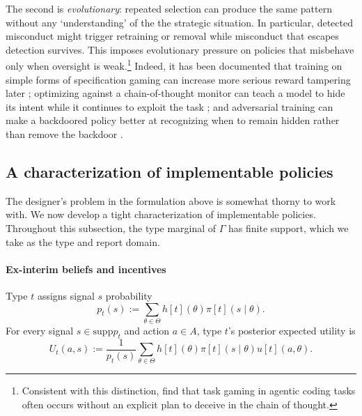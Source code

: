\documentclass[12pt,reqno]{article}
\newcommand{\supp}{\mathrm{supp}}
\newcommand{\Rbar}{\overline{\mathbb{R}}}
\theoremstyle{definition} \newtheorem{example}{Example}
\theoremstyle{definition} \newtheorem{condition}{Condition}
\theoremstyle{definition} \newtheorem{corollary}{Corollary}
\theoremstyle{definition} \newtheorem{claim}{Claim}
\theoremstyle{definition} \newtheorem{definition}{Definition}
\theoremstyle{definition} \newtheorem{conjecture}{Conjecture}
\theoremstyle{definition} \newtheorem{Lemma}{Lemma}
\theoremstyle{definition} \newtheorem{lemma}{Lemma}
\theoremstyle{plain} \newtheorem{theorem}{Theorem}
\theoremstyle{definition} \newtheorem{assumption}{Assumption}
\theoremstyle{definition} \newtheorem*{assumptionnonumber}{Assumption}
\theoremstyle{definition} \newtheorem*{theoremNoNumber}{Proposition}
\theoremstyle{definition}\newtheorem{proposition}{Proposition}
\theoremstyle{definition} \newtheorem{observation}{Observation}
\theoremstyle{definition} \newtheorem*{definitionNoNumber}{Definition}
\theoremstyle{definition} \newtheorem{Definition}{Definition}
\theoremstyle{definition} \newtheorem*{DefinitionNoNumber}{Definition}
\theoremstyle{definition} \newtheorem*{fact}{Fact}
\theoremstyle{definition} \newtheorem*{property}{Property}
\theoremstyle{definition} \newtheorem{remark}{Remark}
\theoremstyle{definition}\newtheorem{romanexampleinner}{Example}
\begin{document}
The second is \emph{evolutionary}: repeated selection can produce the same pattern without any `understanding' of the the strategic situation. In particular, detected misconduct might trigger retraining or removal while misconduct that escapes detection survives. This imposes evolutionary pressure on policies that misbehave only when oversight is weak.\footnote{Consistent with this distinction, \citet{singh2026task} find that task gaming in agentic coding tasks often occurs without an explicit plan to deceive in the chain of thought.} Indeed, it has been documented that training on simple forms of specification gaming can increase more serious reward tampering later \citep{denison2024sycophancy}; optimizing against a chain-of-thought monitor can teach a model to hide its intent while it continues to exploit the task \citep{baker2025monitoring}; and adversarial training can make a backdoored policy better at recognizing when to remain hidden rather than remove the backdoor \citep{hubinger2024sleeper}. 

\subsection{A characterization of implementable policies}\label{sec:taxation-cyclical}
The designer's problem in the formulation above is somewhat thorny to work with. We now develop a tight characterization of implementable policies. Throughout this subsection, the type marginal of $\Gamma$ has finite support, which we take as the type and report domain.

\paragraph{Ex-interim beliefs and incentives}
Type $t$ assigns signal $s$ probability
\[
p_t(s):=\sum_{\theta\in\Theta}h[t](\theta)\pi[t](s\mid\theta).
\]
For every signal $s\in\supp p_t$ and action $a\in A$, type $t$'s posterior expected utility is
\[
U_t(a,s)
:=
\frac{1}{p_t(s)}
\sum_{\theta\in\Theta}
h[t](\theta)\pi[t](s\mid\theta)u[t](a,\theta).
\]
\end{document}
